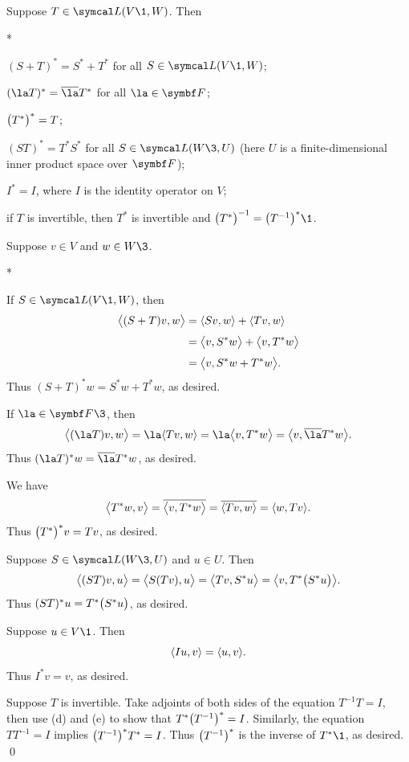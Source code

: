 \pagebreak[3]

{Suppose $T \in \L(V\1, W)$. Then
\begin{subtheorem}*
\item
$(S + T)^* = S^* + T^*$ for all $S\in \L(V\1, W)$;

\item
$(\la T)^* = \bar{\la} T^*$ for all $\la \in \F{}$;

\item
$\paren[\big]{T^*}^* = T$;

\item
$(ST)^* = T^* S^*$ for all $S \in \L(W\3, U)$ (here $U$ is a finite-dimensional inner product space over $\F{}$);

\item
$I^* = I$, where $I$ is the identity operator on $V$;

\item
if $T$ is invertible, then $T^*$ is invertible and $\paren[\big]{T^*}^{-1} = \paren[\big]{ T^{-1} }^*\1$.
\end{subtheorem}
}

\proof
Suppose $v \in V$ and $w \in W\3$.

\begin{subtheorem}*
\item
If $S \in \L(V\1, W)$, then
\begin{align*}
\ip[\big]{(S+T)v, w} &= \ip{Sv, w} + \ip{Tv, w} \\[3bp]
&= \ip[\big]{v, S^*w} + \ip[\big]{v,T^*w}\\[3bp]
&= \ip[\big]{v, S^*w + T^*w}.
\end{align*}
Thus $(S+T)^*w = S^*w + T^*w$, as desired.

\item
If $\la \in \F{}\3$, then
\[
\ip[\big]{(\la T) v, w} = \la \ip{Tv, w}
= \la \ip[\big]{v, T^* w} = \ip[\big]{v, \bar{\la} T^*w}.
\]
Thus $(\la T)^* w = \bar{\la} T^*w$, as desired.

\item
We have
\[
\ip[\big]{T^*w,v} = \overline{ \ip[\big]{v,T^*w} }
= \overline{ \ip{Tv,w }} = \ip{w, Tv}.
\]
Thus $\paren[\big]{T^*}^*v = Tv$, as desired.

\item
Suppose $S \in \L(W\3,U)$ and $u \in U$. Then
\[
\ip[\big]{(ST) v, u} = \ip[\big]{S(Tv), u} = \ip[\big]{Tv, S^*u} = \ip[\big]{v, T^*\paren[\big]{S^*u}}.
\]
Thus $(ST)^* u = T^*\paren[\big]{S^*u}$, as desired.

\item
Suppose $u \in V\1$. Then
\[
\ip{Iu, v} = \ip{u, v}.
\]
Thus $I^*v = v$, as desired.

\item
Suppose $T$ is invertible. Take adjoints of both sides of the equation $T^{-1}T = I$, then use (d) and (e) to show that
$T^* \paren[\big]{T^{-1}}^* = I$. Similarly, the equation $T T^{-1} = I$ implies $\paren[\big]{T^{-1}}^* T^* = I$. Thus $\paren[\big]{T^{-1}}^*$ is the inverse of $T^*\1$, as desired.
\qed
\end{subtheorem}

